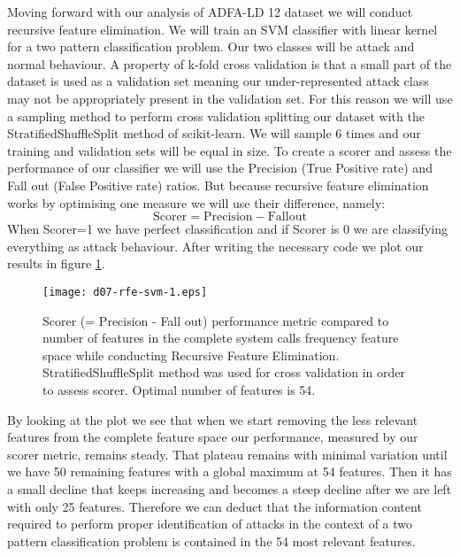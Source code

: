 \documentclass[reqno,openany,12pt]{amsbook}
\newcommand{\beqq}{\begin{equation*}}
\newcommand{\eeqq}{\end{equation*}}
\begin{document}
Moving forward with our analysis of ADFA-LD 12 dataset we will conduct recursive feature elimination. We will train an SVM classifier with linear kernel for a two pattern classification problem. Our two classes will be attack and normal behaviour. A property of k-fold cross validation is that a small part of the dataset is used as a validation set meaning our under-represented attack class may not be appropriately present in the validation set. For this reason we will use a sampling method to perform cross validation splitting our dataset with the StratifiedShuffleSplit method of scikit-learn\cite{skl}. We will sample 6 times and our training and validation sets will be equal in size. To create a scorer and assess the performance of our classifier we will use the Precision (True Positive rate) and Fall out (False Positive rate) ratios. But because recursive feature elimination works by optimising one measure we will use their difference, namely:
\beqq
\mathrm{Scorer = Precision - Fall out}
\eeqq
When Scorer=1 we have perfect classification and if Scorer is 0 we are classifying everything as attack behaviour. After writing the necessary code we plot our results in figure \ref{svm-fr3}.

\begin{figure}[th]
\texttt{[image: d07-rfe-svm-1.eps]}
\caption[Recursive Feature Elimination in the complete frequency feature space.]{Scorer (= Precision - Fall out) performance metric compared to number of features in the complete system calls frequency feature space while conducting Recursive Feature Elimination. StratifiedShuffleSplit method was used for cross validation in order to assess scorer. Optimal number of features is 54.}
\label{svm-fr3}
\end{figure}

By looking at the plot we see that when we start removing the less relevant features from the complete feature space our performance, measured by our scorer metric, remains steady. That plateau remains with minimal variation until we have 50 remaining features with a global maximum at 54 features. Then it has a small decline that keeps increasing and becomes a steep decline after we are left with only 25 features. Therefore we can deduct that the information content required to perform proper identification of attacks in the context of a two pattern classification problem is contained in the 54 most relevant features.


\end{document}
